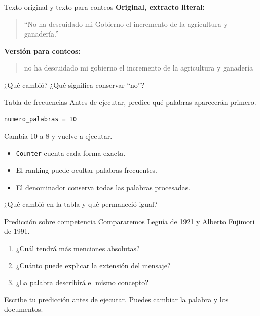\begin{frame}[label=transformacion]{Texto original y texto para conteos}
  \textbf{Original, extracto literal:}
  \begin{quote}
    \enquote{No ha descuidado mi Gobierno el incremento de la agricultura y ganadería.}
  \end{quote}
  \textbf{Versión para conteos:}
  \begin{quote}
    no ha descuidado mi gobierno el incremento de la agricultura y ganadería
  \end{quote}
  ¿Qué cambió? ¿Qué significa conservar \enquote{no}?
\end{frame}

\begin{frame}[fragile,label=frecuencias]{Tabla de frecuencias}
  Antes de ejecutar, predice qué palabras aparecerán primero.
  \begin{verbatim}
numero_palabras = 10
  \end{verbatim}\par
  Cambia 10 a 8 y vuelve a ejecutar.
  \begin{itemize}
    \item \texttt{Counter} cuenta cada forma exacta.
    \item El ranking puede ocultar palabras frecuentes.
    \item El denominador conserva todas las palabras procesadas.
  \end{itemize}
  ¿Qué cambió en la tabla y qué permaneció igual?
\end{frame}

\begin{frame}[label=prediccion]{Predicción sobre competencia}
  Compararemos Leguía de 1921 y Alberto Fujimori de 1991.
  \par\vspace{0.4cm}
  \begin{enumerate}
    \item ¿Cuál tendrá más menciones absolutas?
    \item ¿Cuánto puede explicar la extensión del mensaje?
    \item ¿La palabra describirá el mismo concepto?
  \end{enumerate}
  Escribe tu predicción antes de ejecutar. Puedes cambiar la palabra y los documentos.
\end{frame}

